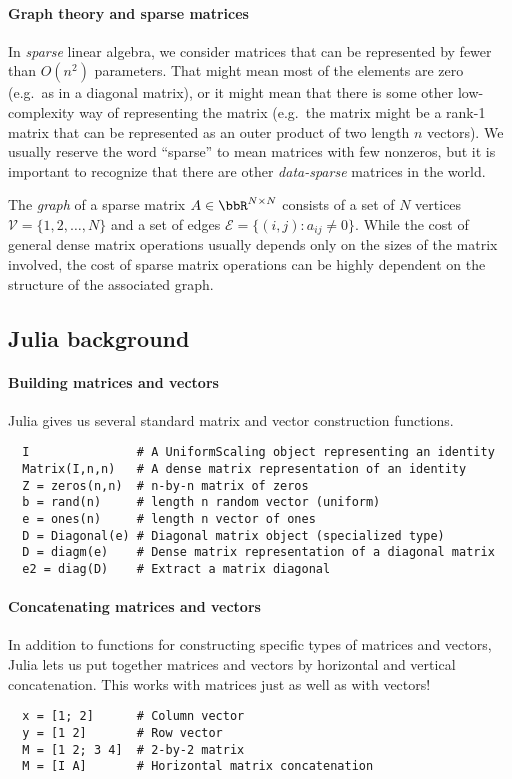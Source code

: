 \documentclass[12pt, leqno]{article}
\begin{document}
\paragraph{Graph theory and sparse matrices}
In {\em sparse} linear algebra, we consider matrices that can be
represented by fewer than $O(n^2)$ parameters.  That might mean most
of the elements are zero (e.g.~as in a diagonal matrix), or it might
mean that there is some other low-complexity way of representing the
matrix (e.g.~the matrix might be a rank-1 matrix that can be
represented as an outer product of two length $n$ vectors).  We
usually reserve the word ``sparse'' to mean matrices with few
nonzeros, but it is important to recognize that there are other
{\em data-sparse} matrices in the world.

The {\em graph} of a sparse matrix $A \in \bbR^{N \times N}$ consists
of a set of $N$ vertices $\mathcal{V} = \{1, 2, \ldots, N\}$ and a set
of edges $\mathcal{E} = \{(i,j) : a_{ij} \neq 0\}$.  While the cost of
general dense matrix operations usually depends only on the sizes of
the matrix involved, the cost of sparse matrix operations can be
highly dependent on the structure of the associated graph.

\subsection{Julia background}

\paragraph{Building matrices and vectors}
Julia gives us several standard matrix and vector construction functions.
\begin{lstlisting}
  I               # A UniformScaling object representing an identity
  Matrix(I,n,n)   # A dense matrix representation of an identity
  Z = zeros(n,n)  # n-by-n matrix of zeros
  b = rand(n)     # length n random vector (uniform)
  e = ones(n)     # length n vector of ones
  D = Diagonal(e) # Diagonal matrix object (specialized type)
  D = diagm(e)    # Dense matrix representation of a diagonal matrix
  e2 = diag(D)    # Extract a matrix diagonal
\end{lstlisting}

\paragraph{Concatenating matrices and vectors}
In addition to functions for constructing specific types of matrices
and vectors, Julia lets us put together matrices and vectors by
horizontal and vertical concatenation.  This works with
matrices just as well as with vectors!
\begin{lstlisting}
  x = [1; 2]      # Column vector
  y = [1 2]       # Row vector
  M = [1 2; 3 4]  # 2-by-2 matrix
  M = [I A]       # Horizontal matrix concatenation
\end{lstlisting}
\end{document}
